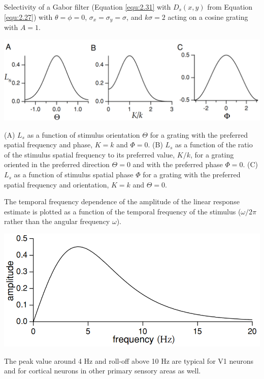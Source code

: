 \begin{exm}
  Selectivity of a Gabor filter (Equation \ref{equ:2.31} with $D_s(x,y)$ from Equation \ref{equ:2.27}) with $\theta = \phi = 0$, $\sigma_x = \sigma_y = \sigma$, and $k\sigma = 2$ acting on a cosine grating with $A = 1$.
  \begin{center}
    \includegraphics[scale=0.2]{./png/showSelectivity}
  \end{center}
  (A) $L_s$ as a function of stimulus orientation $\Theta$ for a grating with the preferred spatial frequency and phase, $K = k$ and $\Phi = 0$. (B) $L_s$ as a function of the ratio of the stimulus spatial frequency to its preferred value, $K/k$, for a grating oriented in the preferred direction $\Theta = 0$ and with the preferred phase $\Phi = 0$. (C) $L_s$ as a function of stimulus spatial phase $\Phi$ for a grating with the preferred spatial frequency and orientation, $K = k$ and $\Theta = 0$.
\end{exm}

\begin{exm}
  The temporal frequency dependence of the amplitude of the linear response estimate  is plotted as a function of the temporal frequency of the stimulus ($\omega/2\pi$ rather than the angular frequency $\omega$).
  \begin{center}
    \includegraphics[scale=0.25]{./png/frequencyAmplitude}
  \end{center}
  The peak value around 4 Hz and roll-off above 10 Hz are typical for V1 neurons and for cortical neurons in other primary sensory areas as well.
\end{exm}

